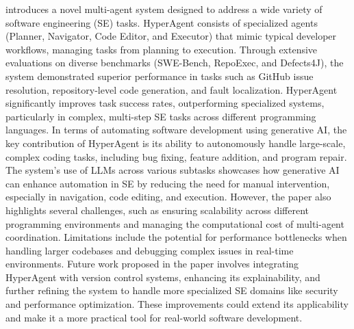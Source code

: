 \citep{phan2024hyperagent} introduces a novel multi-agent system designed to address a wide variety of software engineering (SE) tasks. HyperAgent consists of specialized agents (Planner, Navigator, Code Editor, and Executor) that mimic typical developer workflows, managing tasks from planning to execution. Through extensive evaluations on diverse benchmarks (SWE-Bench, RepoExec, and Defects4J), the system demonstrated superior performance in tasks such as GitHub issue resolution, repository-level code generation, and fault localization. HyperAgent significantly improves task success rates, outperforming specialized systems, particularly in complex, multi-step SE tasks across different programming languages. In terms of automating software development using generative AI, the key contribution of HyperAgent is its ability to autonomously handle large-scale, complex coding tasks, including bug fixing, feature addition, and program repair. The system’s use of LLMs across various subtasks showcases how generative AI can enhance automation in SE by reducing the need for manual intervention, especially in navigation, code editing, and execution. However, the paper also highlights several challenges, such as ensuring scalability across different programming environments and managing the computational cost of multi-agent coordination. Limitations include the potential for performance bottlenecks when handling larger codebases and debugging complex issues in real-time environments. Future work proposed in the paper involves integrating HyperAgent with version control systems, enhancing its explainability, and further refining the system to handle more specialized SE domains like security and performance optimization. These improvements could extend its applicability and make it a more practical tool for real-world software development.
